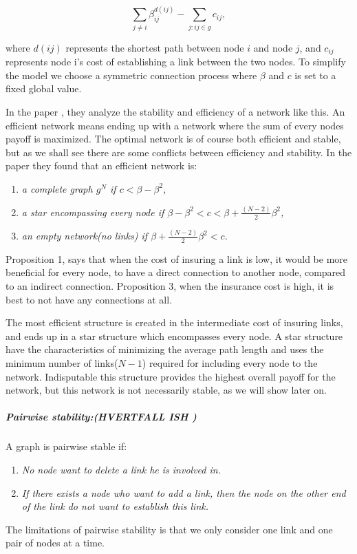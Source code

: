 \begin{equation}
\sum_{j\neq i}^{} \beta_{ij}^{d(ij)} - \sum_{j:ij\in g}^{} {c}_{ij}, 
\label{connecetionGame}
\end{equation}

where $d(ij)$ represents the shortest path between node $i $ and node $j $, and ${c}_{ij}$ represents node i's cost of establishing a link between the two nodes. To simplify the model we choose a symmetric connection process where $\beta$ and $c$ is set to a fixed global value. 

In the paper \cite{jackson1996strategic}, they analyze the stability and efficiency of a network like this. An efficient network means ending up with a network where the sum of every nodes payoff is maximized. The optimal network is of course both efficient and stable, but as we shall see there are some conflicts between efficiency and stability. In the paper they found that an efficient network is:
\begin{enumerate}
\item \textit{a complete graph $g^N$ if $c<\beta - \beta^2$,}
\item \textit{a star encompassing every node if $\beta - \beta^2 < c < \beta + \frac{(N-2)}{2}\beta^2$,}
\item \textit{an empty network(no links) if $\beta + \frac{(N-2)}{2}\beta^2 < c$.}
\end{enumerate}

Proposition 1, says that when the cost of insuring a link is low, it would be more beneficial for every node, to have a direct connection to another node, compared to an indirect connection.
Proposition 3, when the insurance cost is high, it is best to not have any connections at all.

The most efficient structure is created in the intermediate cost of insuring links, and ends up in a star structure which encompasses every node. A star structure have the characteristics of minimizing the average path length and uses the minimum number of links($N-1$) required for including every node to the network. 
Indisputable this structure provides the highest overall payoff for the network, but this network is not necessarily stable, as we will show later on.

\subparagraph{Pairwise stability:(HVERTFALL ISH )}
A graph is pairwise stable if:
 \begin{enumerate}
\item \textit{No node want to delete a link he is involved in.}
\item \textit{If there exists a node who want to add a link, then the node on the other end of the link do not want to establish this link.}
\end{enumerate} 
The limitations of pairwise stability is that we only consider one link and one pair of nodes at a time.


